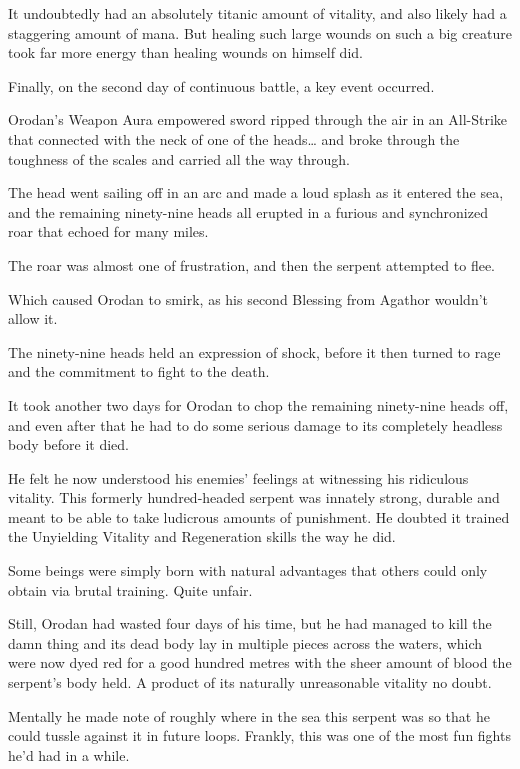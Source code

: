 \documentclass[a4paper,10pt]{book}
\begin{document}
It undoubtedly had an absolutely titanic amount of vitality, and also likely had a staggering amount of mana. But healing such large wounds on such a big creature took far more energy than healing wounds on himself did.\par
Finally, on the second day of continuous battle, a key event occurred.\par
Orodan’s Weapon Aura empowered sword ripped through the air in an All-Strike that connected with the neck of one of the heads… and broke through the toughness of the scales and carried all the way through.\par
The head went sailing off in an arc and made a loud splash as it entered the sea, and the remaining ninety-nine heads all erupted in a furious and synchronized roar that echoed for many miles.\par
The roar was almost one of frustration, and then the serpent attempted to flee.\par
Which caused Orodan to smirk, as his second Blessing from Agathor wouldn’t allow it.\par
The ninety-nine heads held an expression of shock, before it then turned to rage and the commitment to fight to the death.\par
\par
It took another two days for Orodan to chop the remaining ninety-nine heads off, and even after that he had to do some serious damage to its completely headless body before it died.\par
He felt he now understood his enemies’ feelings at witnessing his ridiculous vitality. This formerly hundred-headed serpent was innately strong, durable and meant to be able to take ludicrous amounts of punishment. He doubted it trained the Unyielding Vitality and Regeneration skills the way he did.\par
Some beings were simply born with natural advantages that others could only obtain via brutal training. Quite unfair.\par
Still, Orodan had wasted four days of his time, but he had managed to kill the damn thing and its dead body lay in multiple pieces across the waters, which were now dyed red for a good hundred metres with the sheer amount of blood the serpent’s body held. A product of its naturally unreasonable vitality no doubt.\par
Mentally he made note of roughly where in the sea this serpent was so that he could tussle against it in future loops. Frankly, this was one of the most fun fights he’d had in a while.\par
\end{document}
